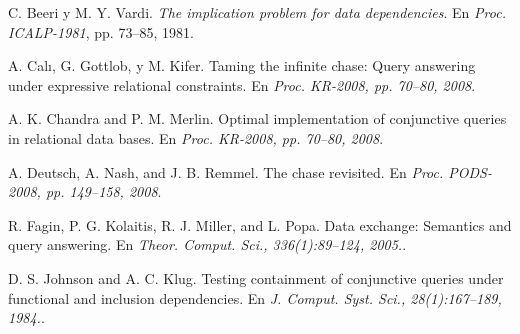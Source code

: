 \documentclass[11pt,a4paper,twoside]{tesis}
\begin{document}
\backmatter
\begin{thebibliography}{9}
    C. Beeri y M. Y. Vardi.
    \textit{The implication problem for data dependencies}. 
    En \textit{Proc. ICALP-1981}, pp. 73–85, 1981.
     
    A. Calı, G. Gottlob, y M. Kifer.
    Taming the infinite chase: Query answering under expressive relational constraints.
    En \textit{Proc. KR-2008, pp. 70–80, 2008}. 

    A. K. Chandra and P. M. Merlin. 
    Optimal implementation of conjunctive queries in relational data bases.
    En \textit{Proc. KR-2008, pp. 70–80, 2008}. 

    A. Deutsch, A. Nash, and J. B. Remmel.
    The chase revisited.
    En \textit{Proc. PODS-2008, pp. 149–158, 2008}. 

    R. Fagin, P. G. Kolaitis, R. J. Miller, and L. Popa.
    Data exchange: Semantics and query answering.
    En \textit{Theor. Comput. Sci., 336(1):89–124, 2005.}. 

    D. S. Johnson and A. C. Klug.
    Testing containment of conjunctive queries under functional and inclusion dependencies.
    En \textit{J. Comput. Syst. Sci., 28(1):167–189, 1984.}. 

    \end{thebibliography}
\end{document}
